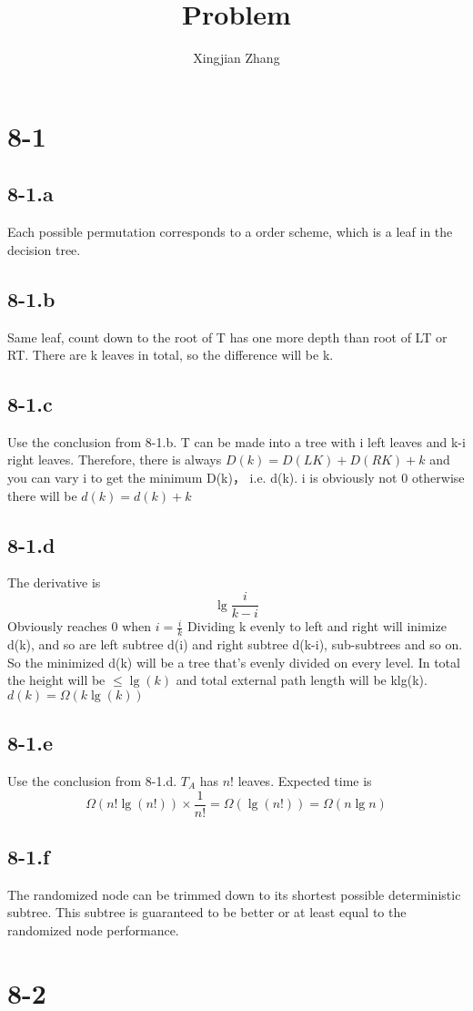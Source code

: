 \documentclass{article}
\author{Xingjian Zhang}
\title{Problem}
\begin{document}
	\section*{8-1}
	\subsection*{8-1.a}
	Each possible permutation corresponds to a order scheme, which is a leaf in the decision tree. 
	\subsection*{8-1.b}
	Same leaf, count down to the root of T has one more depth than root of LT or RT. There are k leaves in total, so the difference will be k.
	\subsection*{8-1.c}
	Use the conclusion from 8-1.b. T can be made into a tree with i left leaves and k-i right leaves.
	Therefore, there is always $D(k) = D(LK) + D(RK) +k$ and you can vary i to get the minimum D(k)， i.e. d(k). i is obviously not 0 otherwise there will be $d(k) = d(k) + k$
	\subsection*{8-1.d}
	The derivative is
	$$\lg\frac{i}{k-i}$$
	Obviously reaches 0 when $i = \frac{i}{k}$
	Dividing k evenly to left and right will inimize d(k), and so are left subtree d(i) and right subtree d(k-i), sub-subtrees and so on. So the minimized d(k) will be a tree that's evenly divided on every level. In total the height will be $\leq \lg(k)$ and total external path length will be klg(k). $d(k) = \Omega(k \lg(k)) $ 
	\subsection*{8-1.e}
	Use the conclusion from 8-1.d. $T_A$ has $n!$ leaves. Expected time is 
	$$\Omega(n!\lg(n!)) \times \frac{1}{n!} = \Omega(\lg(n!)) = \Omega(n\lg n)$$
	\subsection*{8-1.f}
	The randomized node can be trimmed down to its shortest possible deterministic subtree. This subtree is guaranteed to be better or at least equal to the randomized node performance.
	\section*{8-2}
\end{document}
